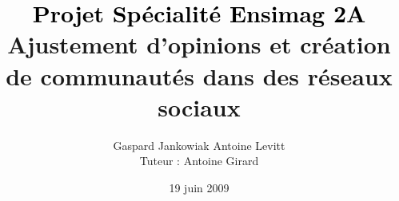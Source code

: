 \documentclass{beamer}
\author{Gaspard Jankowiak \quad Antoine Levitt\\ Tuteur : Antoine Girard}
\title{{\textbf{\textcolor{black}{Projet Spécialité Ensimag 2A}}}\vspace{1cm}\\ \Huge{Ajustement d'opinions et création de communautés dans des réseaux
sociaux}}
\date{19 juin 2009}
\begin{document}
\begin{frame}
	\maketitle
\end{frame}
\end{document}
